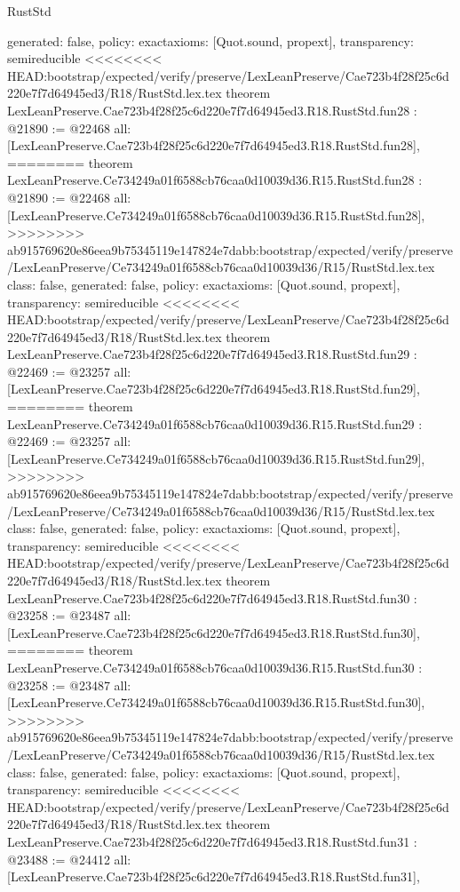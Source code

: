 \begin{lexlean}{RustStd}
\begin{coremodule}
{\begin{coremodule}
{{{{{{{{{{{{{{{{{{{{{{{{{{{{{{{  generated: false,
  policy: exact{axioms: [Quot.sound, propext]},
  transparency: semireducible
}
<<<<<<<< HEAD:bootstrap/expected/verify/preserve/LexLeanPreserve/Cae723b4f28f25c6d220e7f7d64945ed3/R18/RustStd.lex.tex
theorem LexLeanPreserve.Cae723b4f28f25c6d220e7f7d64945ed3.R18.RustStd.fun28 : @21890 := @22468 {
  all: [LexLeanPreserve.Cae723b4f28f25c6d220e7f7d64945ed3.R18.RustStd.fun28],
========
theorem LexLeanPreserve.Ce734249a01f6588cb76caa0d10039d36.R15.RustStd.fun28 : @21890 := @22468 {
  all: [LexLeanPreserve.Ce734249a01f6588cb76caa0d10039d36.R15.RustStd.fun28],
>>>>>>>> ab915769620e86eea9b75345119e147824e7dabb:bootstrap/expected/verify/preserve/LexLeanPreserve/Ce734249a01f6588cb76caa0d10039d36/R15/RustStd.lex.tex
  class: false,
  generated: false,
  policy: exact{axioms: [Quot.sound, propext]},
  transparency: semireducible
}
<<<<<<<< HEAD:bootstrap/expected/verify/preserve/LexLeanPreserve/Cae723b4f28f25c6d220e7f7d64945ed3/R18/RustStd.lex.tex
theorem LexLeanPreserve.Cae723b4f28f25c6d220e7f7d64945ed3.R18.RustStd.fun29 : @22469 := @23257 {
  all: [LexLeanPreserve.Cae723b4f28f25c6d220e7f7d64945ed3.R18.RustStd.fun29],
========
theorem LexLeanPreserve.Ce734249a01f6588cb76caa0d10039d36.R15.RustStd.fun29 : @22469 := @23257 {
  all: [LexLeanPreserve.Ce734249a01f6588cb76caa0d10039d36.R15.RustStd.fun29],
>>>>>>>> ab915769620e86eea9b75345119e147824e7dabb:bootstrap/expected/verify/preserve/LexLeanPreserve/Ce734249a01f6588cb76caa0d10039d36/R15/RustStd.lex.tex
  class: false,
  generated: false,
  policy: exact{axioms: [Quot.sound, propext]},
  transparency: semireducible
}
<<<<<<<< HEAD:bootstrap/expected/verify/preserve/LexLeanPreserve/Cae723b4f28f25c6d220e7f7d64945ed3/R18/RustStd.lex.tex
theorem LexLeanPreserve.Cae723b4f28f25c6d220e7f7d64945ed3.R18.RustStd.fun30 : @23258 := @23487 {
  all: [LexLeanPreserve.Cae723b4f28f25c6d220e7f7d64945ed3.R18.RustStd.fun30],
========
theorem LexLeanPreserve.Ce734249a01f6588cb76caa0d10039d36.R15.RustStd.fun30 : @23258 := @23487 {
  all: [LexLeanPreserve.Ce734249a01f6588cb76caa0d10039d36.R15.RustStd.fun30],
>>>>>>>> ab915769620e86eea9b75345119e147824e7dabb:bootstrap/expected/verify/preserve/LexLeanPreserve/Ce734249a01f6588cb76caa0d10039d36/R15/RustStd.lex.tex
  class: false,
  generated: false,
  policy: exact{axioms: [Quot.sound, propext]},
  transparency: semireducible
}
<<<<<<<< HEAD:bootstrap/expected/verify/preserve/LexLeanPreserve/Cae723b4f28f25c6d220e7f7d64945ed3/R18/RustStd.lex.tex
theorem LexLeanPreserve.Cae723b4f28f25c6d220e7f7d64945ed3.R18.RustStd.fun31 : @23488 := @24412 {
  all: [LexLeanPreserve.Cae723b4f28f25c6d220e7f7d64945ed3.R18.RustStd.fun31],
}}}}}}}}}}}}}}}}}}}}}}}}}}}}}}}}}}
\end{coremodule}}
\end{coremodule}
\end{lexlean}
